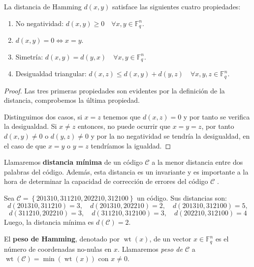 \begin{theorem}
	La distancia de Hamming $d(x,y)$ satisface las siguientes cuatro propiedades:
	\begin{enumerate}
	\item No negatividad: $d(x,y) \geq 0 \quad \forall x,y \in \mathbb{F}_q^n$.
	\item $d(x,y)=0 \Leftrightarrow x = y$.
	\item Simetría: $d(x,y)=d(y,x) \quad \forall x,y \in \mathbb{F}_q^n$.
	\item Desigualdad triangular: $d(x,z)\leq d(x,y) + d(y,z) \quad \forall x,y,z \in \mathbb{F}_q^n$.
	\end{enumerate}
	
\end{theorem}

\begin{proof}
Las tres primeras propiedades son evidentes por la definición de la distancia, comprobemos la última propiedad.

Distinguimos dos casos, si $ x = z $ tenemos que $d(x,z) = 0$ y por tanto se verifica la desigualdad. Si $x \neq z$ entonces, no puede ocurrir que $x = y = z $, por tanto $d(x,y) \neq 0$ o $d(y,z) \neq 0$ y por la no negatividad se tendría la desigualdad, en el caso de que $ x = y$ o $y = z$ tendríamos la igualdad.
\end{proof}

Llamaremos \textbf{distancia mínima} de un código $\mathcal{C}$ a la menor distancia entre dos palabras del código. Además, esta distancia es un invariante y es importante a la hora de determinar la capacidad de corrección de errores del código $\mathcal{C}$ .

\begin{exampleth}
Sea $\mathcal{C} = \left\{ 201310, 311210, 202210, 312100 \right\} $ un código. Sus distancias son:
\[
d(201310, 311210) = 3 , \quad d(201310,202210) = 2, \quad d(201310,312100) = 5,
\]
\[
 d(311210, 202210) = 3, \quad d(311210,312100) = 3, \quad d(202210,312100) = 4 
\]
Luego, la distancia mínima es $d(\mathcal{C}) = 2$.
\end{exampleth}

\begin{definition}
El \textbf{peso de Hamming}, denotado por $\operatorname{wt}(x)$, de un vector $x \in \mathbb{F}_q^n$ es el número de coordenadas no-nulas en $x$. Llamaremos \textit{peso de $\mathcal{C}$} a 
$\operatorname{wt}(\mathcal{C}) = \min(\operatorname{wt}(x))$ con $x \neq 0 $.
\end{definition}

